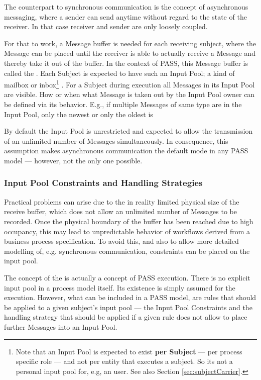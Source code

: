 The counterpart to synchronous communication is the concept of asynchronous messaging, where a sender can send anytime without regard to the state of the receiver. In that case receiver and sender are only loosely coupled. 

For that to work, a Message buffer is needed for each receiving subject, where the Message can be placed until the receiver is able to actually receive a Message and thereby take it out of the buffer. In the context of PASS, this Message buffer is called the \textbf{}. Each Subject is expected to have such an Input Pool; a kind of mailbox or inbox\footnote{Note that an Input Pool is expected to exist \textbf{per Subject} --- per process specific role --- and not per entity that executes a subject. So its not a personal input pool for, e.g, an user. See also Section \ref{sec:subjectCarrier}.} . For a Subject during execution all Messages in its Input Pool are visible. How or when what Message is taken out by the Input Pool owner can be defined via its behavior. E.g., if multiple Messages of same type are in the Input Pool, only the newest or only the oldest is 


By default the Input Pool is unrestricted and expected to allow the transmission of an unlimited number of Messages simultaneously. In consequence, this assumption makes asynchronous communication the default mode in any PASS model --- however, not the only one possible.


\subsubsection{Input Pool Constraints and Handling Strategies}
\label{sec:inputpool}

Practical problems can arise due to the in reality limited physical size of the receive buffer, which does not allow an unlimited number of Messages to be recorded. Once the physical boundary of the buffer has been reached due to high occupancy, this may lead to unpredictable behavior of workflows derived from a business process specification. To avoid this, and also to allow more detailed modelling of, e.g. synchronous communication, constraints can be placed on the input pool.

The concept of the  is actually a concept of PASS execution. There is no explicit input pool in a process model itself. Its existence is simply assumed for the execution. However, what can be included in a PASS model, are rules that should be applied to a given subject's input pool --- the Input Pool Constraints and the handling strategy that should be applied if a given rule does not allow to place further Messages into an Input Pool.

